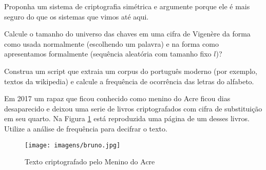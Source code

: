 \begin{exercicio}
  Proponha um sistema de criptografia simétrica e argumente porque ele é mais seguro do que os sistemas que vimos até aqui.
\end{exercicio}

\begin{exercicio}
Calcule o tamanho do universo das chaves em uma cifra de Vigenère da forma como usada normalmente (escolhendo um palavra) e na forma como apresentamos formalmente (sequência aleatória com tamanho fixo $l$)?
\end{exercicio}


\begin{exercicio}
Construa um script que extraia um corpus do português moderno (por exemplo, textos da wikipedia) e calcule a frequência de ocorrência das letras do alfabeto.
\end{exercicio}

\begin{exercicio}
Em 2017 um rapaz que ficou conhecido como menino do Acre ficou dias desaparecido e deixou uma serie de livros criptografados com cifra de substituição em seu quarto.
Na Figura \ref{fig:menino-do-acre} está reproduzida uma página de um desses livros.
Utilize a análise de frequência para decifrar o texto.
\end{exercicio}

\begin{figure}[htbp]
  \centering
  \texttt{[image: imagens/bruno.jpg]}
  \caption{Texto criptografado pelo Menino do Acre}
  \label{fig:menino-do-acre}
\end{figure}
